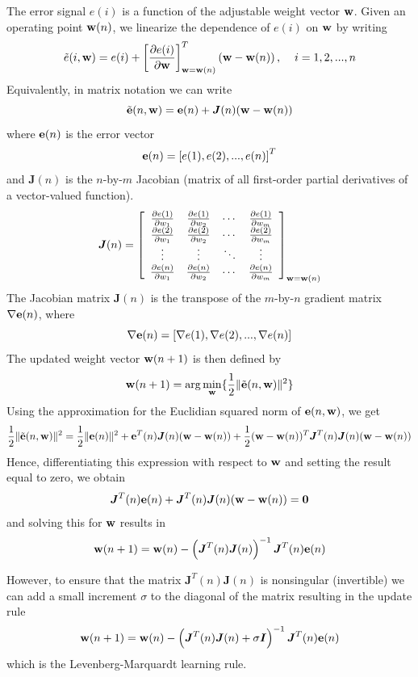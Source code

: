 \documentclass[10pt]{article}
\newcommand{\vect}[1]{{\bf{#1}}}
\newcommand{\matr}[1]{\boldsymbol{#1}}
\begin{document}
\begin{enumerate}
The error signal $e(i)$ is a function of the adjustable weight vector
$\vect{w}$. Given an operating point $\vect{w}(n)$, we linearize the dependence of $e(i)$
on $\vect{w}$ by writing
\[
\tilde{e}(i,\vect{w})=e(i) + \left[ \frac{\partial e(i)}{\partial \vect{w}}
  \right]_{\vect{w}=\vect{w}(n)}^{T} \left(
  \vect{w}-\vect{w}(n)\right), \hspace{4mm} i=1,2,...,n
\]
Equivalently, in matrix notation we can write
\[
\tilde{\vect{e}}(n,\vect{w})=\vect{e}(n)+\matr{J}(n)(\vect{w}-\vect{w}(n))
\]
where $\vect{e}(n)$ is the error vector
\[
\vect{e}(n)=\left[ e(1), e(2), ... , e(n) \right]^T
\]
and $\matr{J}(n)$ is the $n$-by-$m$ Jacobian (matrix of all
first-order partial derivatives of a vector-valued function).
\[
\matr{J}(n)=
\left[ \begin{array}{cccc}
\frac{\partial e(1)}{\partial w_1} & \frac{\partial e(1)}{\partial w_2} & \cdots & \frac{\partial e(1)}{\partial w_m} \\
\frac{\partial e(2)}{\partial w_1} & \frac{\partial e(2)}{\partial w_2} & \cdots & \frac{\partial e(2)}{\partial w_m} \\
\vdots & \vdots & \ddots &  \vdots \\
\frac{\partial e(n)}{\partial w_1} & \frac{\partial e(n)}{\partial w_2} & \cdots & \frac{\partial e(n)}{\partial w_m} 
\end{array} \right]_{\vect{w}=\vect{w}(n)}
\]
The Jacobian matrix $\matr{J}(n)$ is the transpose of the $m$-by-$n$ gradient matrix $\nabla \vect{e}(n)$, where
\[
\nabla \vect{e}(n) = \left[ \nabla e(1),\nabla e(2), ... ,\nabla e(n) \right]
\]
The updated weight vector $\vect{w}(n+1)$ is then defined by
\[
\vect{w}(n+1)=\arg \min_{\vect{w}} \{ \frac{1}{2} \| \tilde{\vect{e}}(n,\vect{w})\|^2\rbrace
\]
Using the approximation for the Euclidian squared norm of
$\vect{e}(n,\vect{w})$, we get
\[
\frac{1}{2} \| \tilde{\vect{e}}(n,\vect{w}) \|^2 = \frac{1}{2} \|\vect{e}(n)\|^2 + \vect{e}^T(n)\matr{J}(n)(\vect{w}-\vect{w}(n)) + \frac{1}{2}(\vect{w}-\vect{w}(n))^T\matr{J}^T(n)\matr{J}(n)(\vect{w}-\vect{w}(n))
\]
Hence, differentiating this expression with respect to $\vect{w}$ and setting the result equal to zero, we obtain
\[
\matr{J}^T(n)\vect{e}(n) + \matr{J}^T(n)\matr{J}(n)(\vect{w}-\vect{w}(n))=\vect{0}
\]
and solving this for $\vect{w}$ results in
\[
\vect{w}(n+1) = \vect{w}(n) - \left(\matr{J}^T(n)\matr{J}(n)\right)^{-1}\matr{J}^T(n)\vect{e}(n)
\]

However, to ensure that the matrix $\matr{J}^T(n)\matr{J}(n)$ is
nonsingular (invertible) we can add a small increment $\sigma$ to the
diagonal of the matrix resulting in the update rule
\[
\vect{w}(n+1) = \vect{w}(n) - \left(\matr{J}^T(n)\matr{J}(n) + \sigma
\matr{I} \right)^{-1}\matr{J}^T(n)\vect{e}(n)
\]
which is the Levenberg-Marquardt learning rule.


\end{enumerate}
\end{document}

